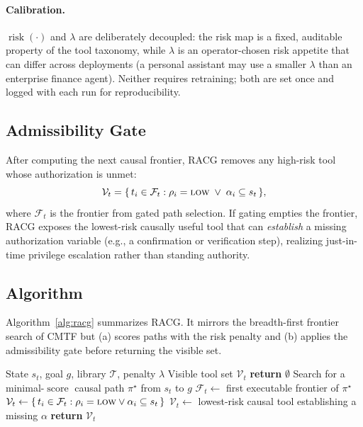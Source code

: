 \documentclass[conference,onecolumn]{IEEEtran}
\begin{document}
\paragraph{Calibration.} $\operatorname{risk}(\cdot)$ and $\lambda$ are deliberately decoupled: the risk map is a fixed, auditable property of the tool taxonomy, while $\lambda$ is an operator-chosen risk appetite that can differ across deployments (a personal assistant may use a smaller $\lambda$ than an enterprise finance agent). Neither requires retraining; both are set once and logged with each run for reproducibility.

\subsection{Admissibility Gate}
After computing the next causal frontier, RACG removes any high-risk tool whose authorization is unmet:
\begin{equation}
\mathcal{V}_t = \{\, t_i \in \mathcal{F}_t : \rho_i=\textsc{low} \;\vee\; \alpha_i \subseteq s_t \,\},
\end{equation}
where $\mathcal{F}_t$ is the frontier from gated path selection. If gating empties the frontier, RACG exposes the lowest-risk causally useful tool that can \emph{establish} a missing authorization variable (e.g., a confirmation or verification step), realizing just-in-time privilege escalation rather than standing authority.

\subsection{Algorithm}
Algorithm~\ref{alg:racg} summarizes RACG. It mirrors the breadth-first frontier search of CMTF but (a) scores paths with the risk penalty and (b) applies the admissibility gate before returning the visible set.

\begin{algorithm}[t]
\caption{Risk-Aware Causal Gating}
\label{alg:racg}
\begin{algorithmic}[1]
\REQUIRE State $s_t$, goal $g$, library $\mathcal{T}$, penalty $\lambda$
\ENSURE Visible tool set $\mathcal{V}_t$
    \STATE \textbf{return} $\emptyset$
\ENDIF
\STATE Search for a minimal-$\operatorname{score}$ causal path $\pi^\star$ from $s_t$ to $g$
\STATE $\mathcal{F}_t \leftarrow$ first executable frontier of $\pi^\star$
\STATE $\mathcal{V}_t \leftarrow \{\, t_i \in \mathcal{F}_t : \rho_i=\textsc{low} \vee \alpha_i \subseteq s_t \,\}$
    \STATE $\mathcal{V}_t \leftarrow$ lowest-risk causal tool establishing a missing $\alpha$
\ENDIF
\STATE \textbf{return} $\mathcal{V}_t$
\end{algorithmic}
\end{algorithm}
\end{document}

